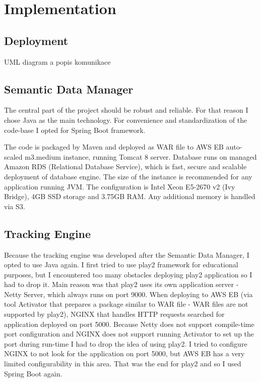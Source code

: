 \chapter{Implementation}

\section{Deployment}
UML diagram a popis komunikace

\section{Semantic Data Manager}
The central part of the project should be robust and reliable. For that reason I chose Java as the main technology. For convenience and standardization of the code-base I opted for Spring Boot framework.

The code is packaged by Maven and deployed as WAR file to AWS EB auto-scaled m3.medium instance, running Tomcat 8 server. Database runs on managed Amazon RDS (Relational Database Service), which is fast, secure and scalable deployment of database engine. The size of the instance is recommended for any application running JVM. The configuration is Intel Xeon E5-2670 v2 (Ivy Bridge), 4GB SSD storage and 3.75GB RAM. Any additional memory is handled via S3.

\section{Tracking Engine}

Because the tracking engine was developed after the Semantic Data Manager, I opted to use Java again. I first tried to use play2 framework for educational purposes, but I encountered too many obstacles deploying play2 application so I had to drop it. Main reason was that play2 uses its own application server - Netty Server, which always runs on port 9000. When deploying to AWS EB (via tool Activator that prepares a package similar to WAR file - WAR files are not supported by play2), NGINX that handles HTTP requests searched for application deployed on port 5000. Because Netty does not support compile-time port configuration and NGINX does not support running Activator to set up the port during run-time I had to drop the idea of using play2. I tried to configure NGINX to not look for the application on port 5000, but AWS EB has a very limited configurability in this area. That was the end for play2 and so I used Spring Boot again.

